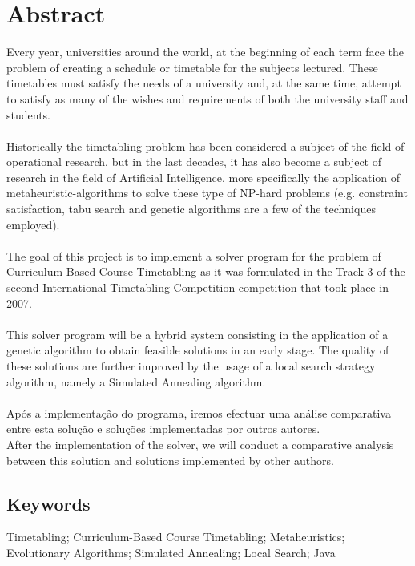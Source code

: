 \chapter*{Abstract}
Every year, universities around the world, at the beginning of each term face the problem of creating a schedule or timetable for the subjects lectured. These timetables must satisfy the needs of a university and, at the same time, attempt to satisfy as many of the wishes and requirements of both the university staff and students. \\
\\
Historically the timetabling problem has been considered a subject of the field of operational research, but in the last decades, it has also become a subject of research in the field of Artificial Intelligence, more specifically the application of metaheuristic-algorithms to solve these type of NP-hard problems (e.g. constraint satisfaction, tabu search and genetic algorithms are a few of the techniques employed). \\
\\
The goal of this project is to implement a solver program for the problem of Curriculum Based Course Timetabling as it was formulated in the Track 3 of the second International Timetabling Competition competition that took place in 2007.\\
\\
This solver program will be a hybrid system consisting in the application of a genetic algorithm to obtain feasible solutions in an early stage. The quality of these solutions are further improved by the usage of a local search strategy algorithm, namely a Simulated Annealing algorithm.\\
\\
Após a implementação do programa, iremos efectuar uma análise comparativa entre esta solução e soluções implementadas por outros autores.\\
After the implementation of the solver, we will conduct a comparative analysis between this solution and solutions implemented by other authors.\\

\section*{Keywords}
Timetabling; Curriculum-Based Course Timetabling; Metaheuristics; Evolutionary Algorithms; Simulated Annealing; Local Search; Java 
